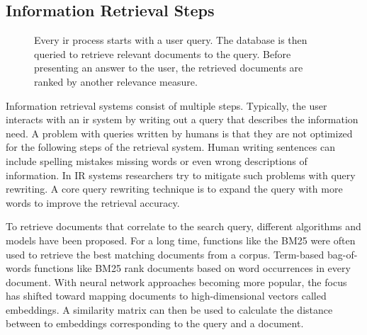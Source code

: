 \documentclass[../main.tex]{subfiles}
\begin{document}
\subsection{Information Retrieval Steps}

\begin{figure}[t]
    \centering
    \caption{Every \gls{ir} process starts with a user query.
        The database is then queried to retrieve relevant documents to the query.
        Before presenting an answer to the user, the retrieved documents are ranked by another relevance measure.}
    \label{fig:ir_steps}
\end{figure}
Information retrieval systems consist of multiple steps.
Typically, the user interacts with an \gls{ir} system
by writing out a query that describes the information need.
A problem with queries written by humans is that they are not optimized for the following steps of the retrieval system.
Human writing sentences can include spelling mistakes missing words or even wrong descriptions of information.
In IR systems researchers try to mitigate such problems with query rewriting.
A core query rewriting technique is to expand the query with more words to improve the retrieval accuracy.

To retrieve documents that correlate to the search query,
different algorithms and models have been proposed.
For a long time, functions like the BM25 \cite{Robertson2009}
were often used to retrieve the best matching documents from a corpus.
Term-based bag-of-words functions like BM25 rank documents based on word occurrences in every document.
With neural network approaches becoming more popular,
the focus has shifted toward mapping documents to high-dimensional vectors called embeddings.
A similarity matrix can then be used to calculate the distance between to embeddings corresponding to the query and a document.
\end{document}
